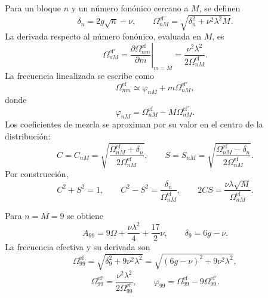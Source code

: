 \documentclass[11pt]{article}
\begin{document}
Para un bloque $n$ y un n\'umero fon\'onico cercano a $M$, se definen
\begin{equation}
  \delta_n=2g\sqrt n-\nu,
  \qquad
  \Omega_{nM}^{\mathrm{ef}}
  =
  \sqrt{\delta_n^2+\nu^2\lambda^2M}.
\end{equation}
La derivada respecto al n\'umero fon\'onico, evaluada en $M$, es
\begin{equation}
  \boxed{
  \Omega_{nM}^{\mathrm{ef}\prime}
  =
  \left.
  \frac{\partial\Omega_{nm}^{\mathrm{ef}}}{\partial m}
  \right|_{m=M}
  =
  \frac{\nu^2\lambda^2}{2\Omega_{nM}^{\mathrm{ef}}}.
  }
\end{equation}
La frecuencia linealizada se escribe como
\begin{equation}
  \Omega_{nm}^{\mathrm{ef}}
  \simeq
  \varphi_{nM}+m\Omega_{nM}^{\mathrm{ef}\prime},
\end{equation}
donde
\begin{equation}
  \boxed{
  \varphi_{nM}
  =
  \Omega_{nM}^{\mathrm{ef}}
  -M\Omega_{nM}^{\mathrm{ef}\prime}.
  }
\end{equation}
Los coeficientes de mezcla se aproximan por su valor en el centro de la
distribuci\'on:
\begin{equation}
  C=C_{nM}
  =
  \sqrt{
  \frac{\Omega_{nM}^{\mathrm{ef}}+\delta_n}
  {2\Omega_{nM}^{\mathrm{ef}}}
  },
  \qquad
  S=S_{nM}
  =
  \sqrt{
  \frac{\Omega_{nM}^{\mathrm{ef}}-\delta_n}
  {2\Omega_{nM}^{\mathrm{ef}}}
  }.
\end{equation}
Por construcci\'on,
\begin{equation}
  C^2+S^2=1,
  \qquad
  C^2-S^2
  =
  \frac{\delta_n}{\Omega_{nM}^{\mathrm{ef}}},
  \qquad
  2CS
  =
  \frac{\nu\lambda\sqrt M}{\Omega_{nM}^{\mathrm{ef}}}.
\end{equation}

Para $n=M=9$ se obtiene
\begin{equation}
  \boxed{
  A_{99}
  =
  9\Omega+\frac{\nu\lambda^2}{4}+\frac{17}{2}\nu,
  \qquad
  \delta_9=6g-\nu.
  }
\end{equation}
La frecuencia efectiva y su derivada son
\begin{equation}
  \boxed{
  \Omega_{99}^{\mathrm{ef}}
  =
  \sqrt{\delta_9^2+9\nu^2\lambda^2}
  =
  \sqrt{(6g-\nu)^2+9\nu^2\lambda^2},
  }
\end{equation}
\begin{equation}
  \boxed{
  \Omega_{99}^{\mathrm{ef}\prime}
  =
  \frac{\nu^2\lambda^2}{2\Omega_{99}^{\mathrm{ef}}},
  \qquad
  \varphi_{99}
  =
  \Omega_{99}^{\mathrm{ef}}
  -9\Omega_{99}^{\mathrm{ef}\prime}.
  }
\end{equation}
\end{document}
